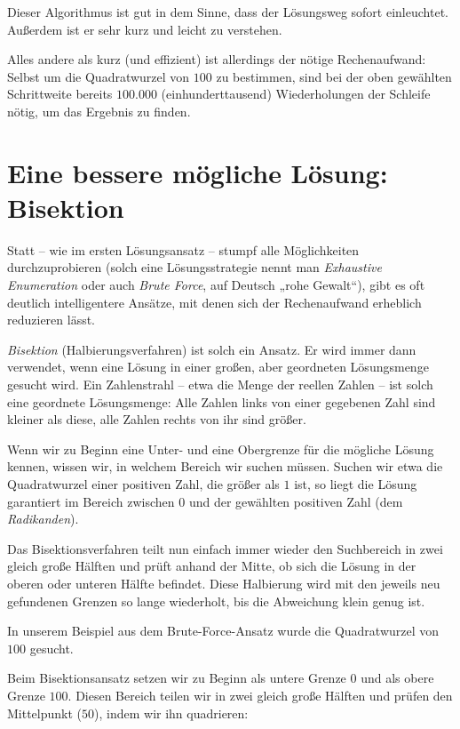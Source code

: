 Dieser Algorithmus ist gut in dem Sinne, dass der Lösungsweg sofort einleuchtet.
Außerdem ist er sehr kurz und leicht zu verstehen.

Alles andere als kurz (und effizient) ist allerdings der nötige Rechenaufwand:
Selbst um die Quadratwurzel von $100$ zu bestimmen, sind bei der oben gewählten
Schrittweite bereits $100.000$ (einhunderttausend) Wiederholungen der Schleife
nötig, um das Ergebnis zu finden.


\section{Eine bessere mögliche Lösung: Bisektion}

Statt -- wie im ersten Lösungsansatz -- stumpf alle Möglichkeiten
durchzuprobieren (solch eine Lösungsstrategie nennt man \emph{Exhaustive
Enumeration} oder auch \emph{Brute Force}, auf Deutsch „rohe Gewalt“), gibt es
oft deutlich intelligentere Ansätze, mit denen sich der Rechenaufwand erheblich
reduzieren lässt.

\emph{Bisektion} (Halbierungsverfahren) ist solch ein Ansatz. Er wird immer
dann verwendet, wenn eine Lösung in einer großen, aber geordneten Lösungsmenge
gesucht wird. Ein Zahlenstrahl -- etwa die Menge der reellen Zahlen -- ist
solch eine geordnete Lösungsmenge: Alle Zahlen links von einer gegebenen Zahl
sind kleiner als diese, alle Zahlen rechts von ihr sind größer.

Wenn wir zu Beginn eine Unter- und eine Obergrenze für die mögliche Lösung
kennen, wissen wir, in welchem Bereich wir suchen müssen. Suchen wir etwa die
Quadratwurzel einer positiven Zahl, die größer als $1$ ist, so liegt die Lösung
garantiert im Bereich zwischen $0$ und der gewählten positiven Zahl (dem
\emph{Radikanden}).

Das Bisektionsverfahren teilt nun einfach immer wieder den Suchbereich in zwei
gleich große Hälften und prüft anhand der Mitte, ob sich die Lösung in der
oberen oder unteren Hälfte befindet. Diese Halbierung wird mit den jeweils neu
gefundenen Grenzen so lange wiederholt, bis die Abweichung klein genug ist.

In unserem Beispiel aus dem Brute-Force-Ansatz wurde die Quadratwurzel von $100$
gesucht.

Beim Bisektionsansatz setzen wir zu Beginn als untere Grenze $0$ und als obere
Grenze $100$. Diesen Bereich teilen wir in zwei gleich große Hälften und prüfen
den Mittelpunkt ($50$), indem wir ihn quadrieren:

